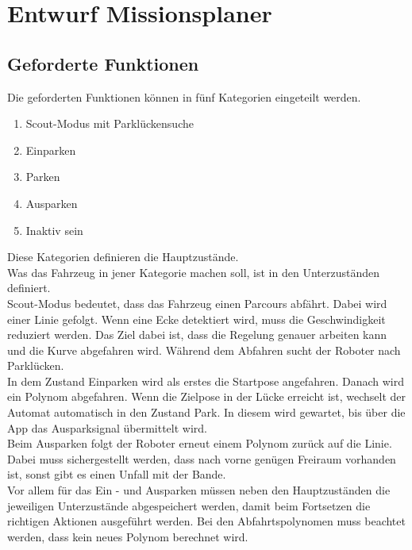 \chapter{Entwurf Missionsplaner}

\section{Geforderte Funktionen}

Die geforderten Funktionen können in fünf Kategorien eingeteilt werden.
\renewcommand{\labelenumi}{\roman{enumi}}
\begin{enumerate}
\item 	Scout-Modus mit Parklückensuche
\item 	Einparken
\item	Parken
\item	Ausparken
\item	Inaktiv sein
\end{enumerate}

\noindent Diese Kategorien definieren die Hauptzustände.\\

\noindent Was das Fahrzeug in jener Kategorie machen soll, ist in den Unterzuständen definiert.\\


\noindent Scout-Modus bedeutet, dass das Fahrzeug einen Parcours abfährt. Dabei wird einer Linie gefolgt. Wenn eine Ecke detektiert wird, muss die Geschwindigkeit reduziert werden. Das Ziel dabei ist, dass die Regelung genauer arbeiten kann und die Kurve abgefahren wird. Während dem Abfahren sucht der Roboter nach Parklücken.\\

\noindent In dem Zustand \glqq Einparken\grqq{} wird als erstes die Startpose angefahren. Danach wird ein Polynom abgefahren. Wenn die Zielpose in der Lücke erreicht ist, wechselt der Automat automatisch in den Zustand Park. In diesem wird gewartet, bis über die App das Ausparksignal übermittelt wird.\\

\noindent Beim Ausparken folgt der Roboter erneut einem Polynom zurück auf die Linie. Dabei muss sichergestellt werden, dass nach vorne genügen Freiraum vorhanden ist, sonst gibt es einen Unfall mit der Bande.\\

\noindent Vor allem für das Ein - und Ausparken müssen neben den Hauptzuständen die jeweiligen Unterzustände abgespeichert werden, damit beim Fortsetzen die richtigen Aktionen ausgeführt werden. Bei den Abfahrtspolynomen muss beachtet werden, dass kein neues Polynom berechnet wird. 



